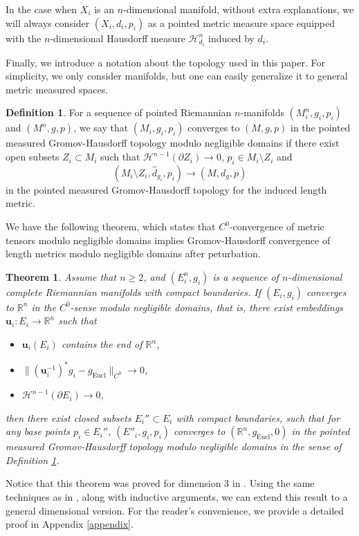 \documentclass[letter]{amsart}
\newtheorem{thm}{Theorem}[section]
\theoremstyle{definition}
\newtheorem{defn}{Definition}[section]
\theoremstyle{remark}
\begin{document}
In the case when $X_i$ is an $n$-dimensional manifold, without extra explanations, we will always consider $(X_i, d_i, p_i)$ as a pointed metric measure space equipped with the $n$-dimensional Hausdorff measure $\mathcal{H}^n_{d_i}$ induced by $d_i$.

Finally, we introduce a notation about the topology used in this paper. For simplicity, we only consider manifolds, but one can easily generalize it to general metric measured spaces.
\begin{defn}\label{pm-GH mod}
For a sequence of pointed Riemannian $n$-manifolds $(M_i^n, g_i, p_i)$ and $(M^n, g, p)$, we say that $(M_i, g_i, p_i)$ converges to $(M, g, p)$ in the pointed measured Gromov-Hausdorff topology modulo negligible domains if there exist open subsets $Z_i \subset M_i$ such that $\mathcal{H}^{n-1}(\partial Z_i) \to 0$, $p_i \in M_i \setminus Z_i$ and 
$$
(M_i \setminus Z_i, \hat{d}_{g_i}, p_i) \to (M, d_g, p)
$$ 
in the pointed measured Gromov-Hausdorff topology for the induced length metric.
\end{defn}

We have the following theorem, which states that $C^0$-convergence of metric tensors modulo negligible domains implies Gromov-Hausdorff convergence of length metrics modulo negligible domains after peturbation.
\begin{thm}\label{GH-spikes}
	Assume that $n \geq 2$, and $(E_i^n, g_i)$ is a sequence of $n$-dimensional complete Riemannian manifolds with compact boundaries. If $(E_i, g_i)$ converges to $\mathbb{R}^n$ in the $C^0$-sense modulo negligible domains, that is, there exist embeddings $\mathbf{u}_i: E_i \to \mathbb{R}^n$ such that 
\begin{itemize}
	\item $\mathbf{u}_i(E_i)$ contains the end of $\mathbb{R}^n$,
	\item $\|(\mathbf{u}_{i}^{-1})^* g_i - g_{\mathrm{Eucl}}\|_{C^0} \to 0$,
	\item $\mathcal{H}^{n-1}(\partial E_i) \to 0$, 
\end{itemize}
then there exist closed subsets $E_i'' \subset E_i$ with compact boundaries, such that for any base points $p_i \in E_i''$, $(E''_i, g_i, p_i)$ converges to $(\mathbb{R}^n, g_{\mathrm{Eucl}}, 0)$ in the pointed measured Gromov-Hausdorff topology modulo negligible domains in the sense of Definition \ref{pm-GH mod}.
\end{thm}
Notice that this theorem was proved for dimension $3$ in \cite{DS'23}.
Using the same techniques as in \cite{DS'23}, along with inductive arguments, we can extend this result to a general dimensional version. For the reader's convenience, we provide a detailed proof in Appendix \ref{appendix}.
\end{document}
